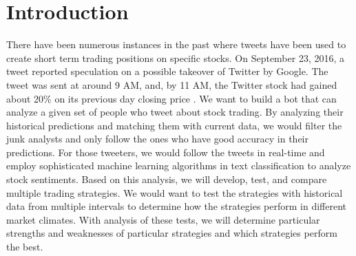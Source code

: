 \section{Introduction}

There have been numerous instances in the past where tweets have been used to create short term trading positions on specific stocks.
On September 23, 2016, a tweet reported speculation on a possible takeover of Twitter by Google.
The tweet was sent at around 9 AM, and, by 11 AM, the Twitter stock had gained about 20\% on its previous day closing price \cite{twitterTakeover}.
We want to build a bot that can analyze a given set of people who tweet about stock trading.
By analyzing their historical predictions and matching them with current data, we would filter the junk analysts and only follow the ones who have good accuracy in their predictions.
For those tweeters, we would follow the tweets in real-time and employ sophisticated machine learning algorithms in text classification to analyze stock sentiments.
Based on this analysis, we will develop, test, and compare multiple trading strategies.
We would want to test the strategies with historical data from multiple intervals to determine how the strategies perform in different market climates.
With analysis of these tests, we will determine particular strengths and weaknesses of particular strategies and which strategies perform the best.

